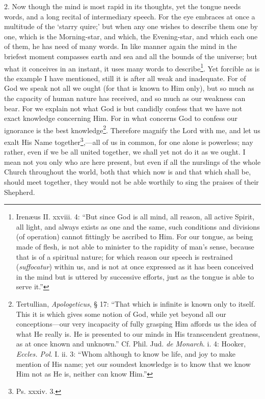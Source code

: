 2. Now though the mind is most rapid in its thoughts, yet the tongue needs words, and a long recital of intermediary speech. For the eye embraces at once a multitude of the ‘starry quire;’ but when any one wishes to describe them one by one, which is the Morning-star, and which, the Evening-star, and which each one of them, he has need of many words. In like manner again the mind in the briefest moment compasses earth and sea and all the bounds of the universe; but what it conceives in an instant, it uses many words to describe\footnote{Irenæus II. xxviii. 4: “But since God is all mind, all reason, all active Spirit, all light, and always exists as one and the same, such conditions and divisions (of operation) cannot fittingly be ascribed to Him. For our tongue, as being made of flesh, is not able to minister to the rapidity of man’s sense, because that is of a spiritual nature; for which reason our speech is restrained (\emph{suffocatur}) within us, and is not at once expressed as it has been conceived in the mind but is uttered by successive efforts, just as the tongue is able to serve it.”}. Yet forcible as is the example I have mentioned, still it is after all weak and inadequate. For of God we speak not all we ought (for that is known to Him only), but so much as the capacity of human nature has received, and so much as our weakness can bear. For we explain not what God is but candidly confess that we have not exact knowledge concerning Him. For in what concerns God to confess our ignorance is the best knowledge\footnote{Tertullian, \emph{Apologeticus}, § 17: “That which is infinite is known only to itself. This it is which gives some notion of God, while yet beyond all our conceptions—our very incapacity of fully grasping Him affords us the idea of what He really is. He is presented to our minds in His transcendent greatness, as at once known and unknown.” Cf. Phil. Jud. \emph{de Monarch}. i. 4: Hooker, \emph{Eccles. Pol}. I. ii. 3: “Whom although to know be life, and joy to make mention of His name; yet our soundest knowledge is to know that we know Him not as He is, neither can know Him.”}. Therefore magnify the Lord with me, and let us exalt His Name together\footnote{Ps. xxxiv. 3.},—all of us in common, for one alone is powerless; nay rather, even if we be all united together, we shall yet not do it as we ought. I mean not you only who are here present, but even if all the nurslings of the whole Church throughout the world, both that which now is and that which shall be, should meet together, they would not be able worthily to sing the praises of their Shepherd.

